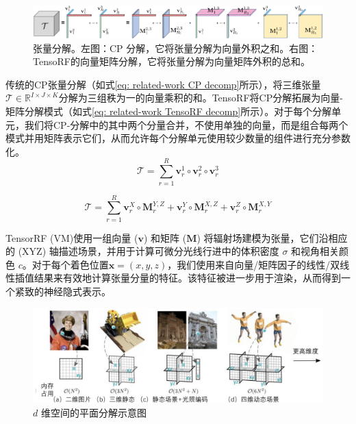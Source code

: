 \begin{figure}[h]
    \centering
    \includegraphics[width=\textwidth]{undergraduate-thesis/images/related-work/Tensor Decomp.png}
    \caption{张量分解。左图：CP 分解，它将张量分解为向量外积之和。右图：TensoRF的向量矩阵分解，它将张量分解为向量矩阵外积的总和。}
    \label{fig:related-work tensor-decomp}
\end{figure}

传统的CP张量分解（如式\ref{eq: related-work CP decomp}所示），将三维张量$\mathcal{T}\in\mathbb{R}^{I\times J\times K}$分解为三组秩为一的向量乘积的和。TensoRF将CP分解拓展为向量-矩阵分解模式（如式\ref{eq: related-work TensoRF decomp}所示）。对于每个分解单元，我们将CP-分解中的其中两个分量合并，不使用单独的向量，而是组合每两个模式并用矩阵表示它们，从而允许每个分解单元使用较少数量的组件进行充分参数化。
\begin{equation}
    \mathcal{T} = \sum_{r=1}^R\mathbf{v}_r^1\circ\mathbf{v}_r^2\circ\mathbf{v}_r^3
    \label{eq: related-work CP decomp}
\end{equation}

\begin{equation}
    \mathcal{T} = \sum_{r=1}^R\mathbf{v}_r^X\circ\mathbf{M}_r^{Y,Z}+\mathbf{v}_r^Y\circ\mathbf{M}_r^{X,Z}+\mathbf{v}_r^Z\circ\mathbf{M}_r^{X,Y}
    \label{eq: related-work TensoRF decomp}
\end{equation}

TensorRF (VM)使用一组向量 ($\mathbf{v}$) 和矩阵 ($\mathbf{M}$) 将辐射场建模为张量，它们沿相应的 (XYZ) 轴描述场景，并用于计算可微分光线行进中的体积密度 $\sigma$ 和视角相关颜色 $c$。对于每个着色位置$ \mathbf{x} = (x, y, z)$，我们使用来自向量/矩阵因子的线性/双线性插值结果来有效地计算张量分量的特征。该特征被进一步用于渲染，从而得到一个紧致的神经隐式表示。

\begin{figure}[ht]
    \centering
    \includegraphics[width=\textwidth]{undergraduate-thesis/images/related-work/kplanes-teaser.pdf}
    \caption{$d$ 维空间的平面分解示意图}
    \label{fig:related-work kplane-teaser}
\end{figure}

